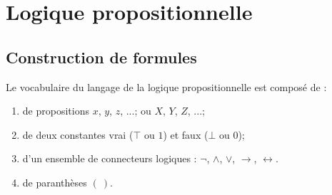 \documentclass[a4paper, 12pt]{extarticle}
\begin{document}


\makemargins %
\makefrontpage
\maketoc


% 



\section{Logique propositionnelle}
\subsection{Construction de formules}
Le vocabulaire du langage de la logique propositionnelle est composé de :
\begin{enumerate}
  \item de propositions $x$, $y$, $z$, ...; ou $X$, $Y$, $Z$, ...;
  \item de deux constantes vrai ($\top$ ou $1$) et faux ($\bot$ ou $0$);
  \item d'un ensemble de connecteurs logiques : $\neg$, $\wedge$, $\vee$, $\rightarrow$, $\leftrightarrow$.
  \item de paranthèses $(\ )$.
\end{enumerate}
\end{document}
